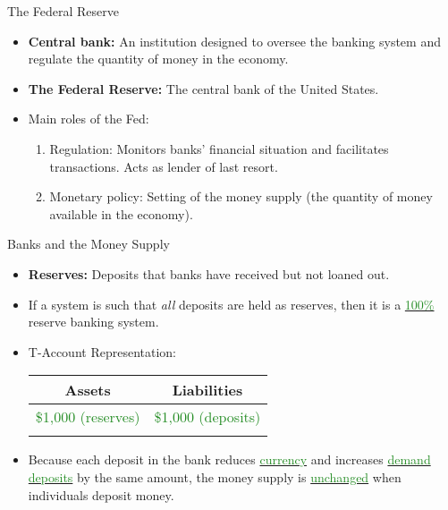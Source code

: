 \documentclass[xcolor={dvipsnames},pdf, hyperref={colorlinks=true, citecolor=ForestGreen, linkcolor=BlueViolet, urlcolor=Magenta}]{beamer}
\theoremstyle{definition}
\newcommand{\defn}[1]{\textbf{#1}}
\newcommand{\ddp}[1]{{\textcolor{ForestGreen}{#1}}}
\newcommand{\dd}[1]{{\underline{\textcolor{ForestGreen}{#1}}}}
\begin{document}
\begin{frame}{The Federal Reserve}
\begin{itemize}
	\item \defn{Central bank:} An institution designed to oversee the banking system and regulate the quantity of money in the economy.
	
	\item \defn{The Federal Reserve:} The central bank of the United States.
	
	\item Main roles of the Fed:
	\begin{enumerate}
		\item Regulation: Monitors banks' financial situation and facilitates transactions. Acts as lender of last resort.
		\item Monetary policy: Setting of the money supply (the quantity of money available in the economy).
	\end{enumerate}
\end{itemize}
\end{frame}

\begin{frame}{Banks and the Money Supply}
\begin{itemize}
	\item \defn{Reserves:} Deposits that banks have received but not loaned out.
	
	\item If a system is such that \textit{all} deposits are held as reserves, then it is a \dd{100\%} reserve banking system. 
	
	
	\item T-Account Representation:
	
	\begin{table}[ht]
		\centering
		\begin{tabular}{c|c }        
			
			Assets & Liabilities \\
			\hline
			\ddp{\$1,000 (reserves)}	&  \ddp{\$1,000 (deposits)}\\
			
			& \\
			
		\end{tabular}
	\end{table}
	
	\item Because each deposit in the bank reduces \dd{currency} and increases \dd{demand deposits} by the same amount, the money supply is \dd{unchanged} when individuals deposit money. 
	
\end{itemize}
\end{frame}
\end{document}
